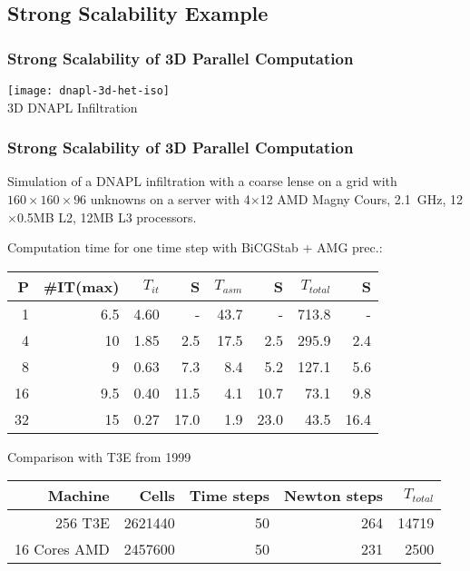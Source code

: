\subsection{Strong Scalability Example}
\begin{frame}
\frametitle<presentation>{Strong Scalability of 3D Parallel Computation}
\begin{center}
\texttt{[image: dnapl-3d-het-iso]}\\
3D DNAPL Infiltration
\end{center}
\end{frame}


\begin{frame}
\frametitle<presentation>{Strong Scalability of 3D Parallel Computation}
Simulation of a DNAPL infiltration with a coarse lense on a grid with  $160 \times 160 \times 96$
unknowns on a server with 4$\times$12  AMD Magny Cours, 2.1~GHz, 12$\times$0.5MB L2, 12MB
L3 processors.

Computation time for one time step with BiCGStab + AMG prec.:
\begin{center}
\begin{tabular}{r|rrr|rr|rr}
\hline
P  & \#IT(max) & $T_{it}$ & S & $T_{asm}$ & S & $T_{total}$ & S \\
\hline
 1  &  6.5 & 4.60 &      - &  43.7 &      - & 713.8 &    - \\
 4  &  10  & 1.85 &   2.5 &  17.5 &   2.5 & 295.9 & 2.4 \\
 8  &  9    & 0.63 &   7.3 &    8.4 &   5.2 & 127.1 & 5.6 \\
16 &  9.5 & 0.40 & 11.5 &    4.1 & 10.7 &   73.1 & 9.8 \\
32 &  15  & 0.27 & 17.0 &    1.9 & 23.0 &   43.5 & 16.4 \\
\hline
\end{tabular}
\end{center}

Comparison with T3E from 1999
\begin{center}
\begin{tabular}{r|rrrr}
\hline
Machine  & Cells & Time steps & Newton steps & $T_{total}$ \\
\hline
256 T3E        & 2621440 &  50 & 264 & 14719\\
16 Cores AMD & 2457600 & 50 & 231 & 2500\\
\hline
\end{tabular}
\end{center}
\vfill
\end{frame}


